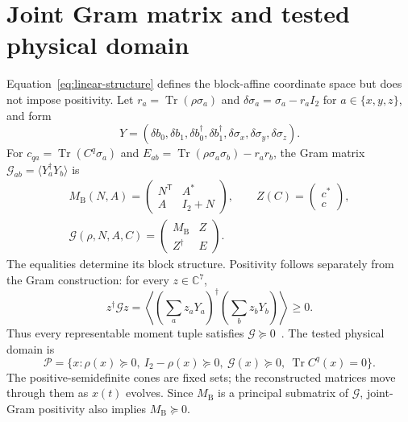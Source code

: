 \documentclass[10pt,twocolumn]{article}
\newcommand{\C}{\mathbb C}
\newcommand{\I}{I}
\newcommand{\Tr}{\operatorname{Tr}}
\newcommand{\MB}{M_{\mathrm B}}
\begin{document}
\section{Joint Gram matrix and tested physical domain}

Equation~\eqref{eq:linear-structure} defines the block-affine coordinate
space but does not impose positivity.  Let
$r_a=\Tr(\rho\sigma_a)$ and
$\delta\sigma_a=\sigma_a-r_a\I_2$ for $a\in\{x,y,z\}$, and form
\begin{equation}
Y=(\delta b_0,\delta b_1,\delta b_0^\dagger,\delta b_1^\dagger,
\delta\sigma_x,\delta\sigma_y,\delta\sigma_z).
\label{eq:operator-row}
\end{equation}
For $c_{qa}=\Tr(C^q\sigma_a)$ and
$E_{ab}=\Tr(\rho\sigma_a\sigma_b)-r_ar_b$, the Gram matrix
$\mathcal G_{ab}=\langle Y_a^\dagger Y_b\rangle$ is
\begin{equation}
\begin{gathered}
\MB(N,A)=\begin{pmatrix}N^{\mathsf T}&A^*\\A&\I_2+N\end{pmatrix},
\qquad Z(C)=\begin{pmatrix}c^*\\c\end{pmatrix},\\
\boxed{\mathcal G(\rho,N,A,C)=
\begin{pmatrix}\MB&Z\\Z^\dagger&E\end{pmatrix}.}
\end{gathered}
\label{eq:joint-gram}
\end{equation}
The equalities determine its block structure.  Positivity follows separately
from the Gram construction: for every $z\in\C^7$,
\begin{equation}
z^\dagger\mathcal Gz=
\left\langle\left(\sum_a z_aY_a\right)^\dagger
\left(\sum_bz_bY_b\right)\right\rangle\geq0.
\label{eq:gram-psd-proof}
\end{equation}
Thus every representable moment tuple satisfies
$\mathcal G\succeq0$~\cite{hornJohnson2012}.  The tested physical domain is
\begin{equation}
\mathcal P=\{x:\rho(x)\succeq0,\ \I_2-\rho(x)\succeq0,
\ \mathcal G(x)\succeq0,\ \Tr C^q(x)=0\}.
\label{eq:physical-domain}
\end{equation}
The positive-semidefinite cones are fixed sets; the reconstructed matrices
move through them as $x(t)$ evolves.  Since $\MB$ is a principal submatrix of
$\mathcal G$, joint-Gram positivity also implies $\MB\succeq0$.
\end{document}
